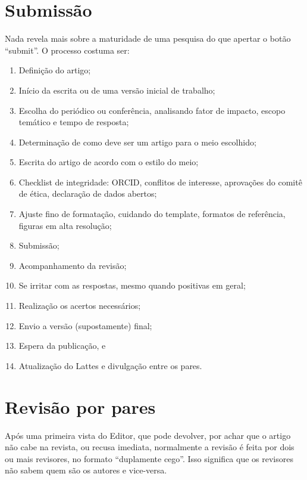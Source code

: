  \section{Submissão}

Nada revela mais sobre a maturidade de uma pesquisa do que apertar o botão ``submit''. O processo costuma ser:

\begin{enumerate}
\item Definição do artigo;
\item Início da escrita ou de uma versão inicial de trabalho;
  \item Escolha  do periódico ou conferência, analisando
        fator de impacto, escopo temático e tempo de resposta;
    \item Determinação de como deve ser um artigo para o meio escolhido;
    \item Escrita do artigo de acordo com o estilo do meio;
  \item Checklist de integridade: ORCID, conflitos de interesse, aprovações do comitê de ética, declaração de dados abertos;
  \item Ajuste fino de formatação, cuidando do template, formatos de referência, figuras em alta resolução;
  \item Submissão; 
  \item Acompanhamento da revisão; \label{passo:acompanhar}
  \item Se irritar com as respostas, mesmo quando positivas em geral;
  \item Realização os acertos necessários; 
  \item Envio a versão (supostamente) final;
  \item Espera da publicação, e
  \item Atualização do Lattes e divulgação entre os pares.
\end{enumerate}



 \section{Revisão por pares}

Após uma primeira vista do Editor, que pode devolver, por achar que o artigo não cabe na revista, ou recusa imediata, normalmente a revisão é feita por dois ou mais revisores, no formato ``duplamente cego''.  Isso significa que os revisores não sabem quem são os autores e vice-versa. 

